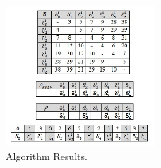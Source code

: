 \begin{figure}[h!]
\begin{center}
\includegraphics[width=0.5\textwidth]{algo_example_3.jpg}
\caption{Algorithm Results.}
\label{fig:algo_example_3}
\end{center}
\end{figure}
